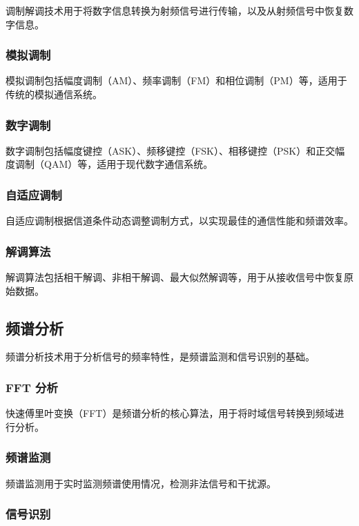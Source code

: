\documentclass[UTF8]{ctexbook}
\begin{document}
调制解调技术用于将数字信息转换为射频信号进行传输，以及从射频信号中恢复数字信息。

\subsubsection{模拟调制}

模拟调制包括幅度调制（AM）、频率调制（FM）和相位调制（PM）等，适用于传统的模拟通信系统。

\subsubsection{数字调制}

数字调制包括幅度键控（ASK）、频移键控（FSK）、相移键控（PSK）和正交幅度调制（QAM）等，适用于现代数字通信系统。

\subsubsection{自适应调制}

自适应调制根据信道条件动态调整调制方式，以实现最佳的通信性能和频谱效率。

\subsubsection{解调算法}

解调算法包括相干解调、非相干解调、最大似然解调等，用于从接收信号中恢复原始数据。

\subsection{频谱分析}

频谱分析技术用于分析信号的频率特性，是频谱监测和信号识别的基础。

\subsubsection{FFT 分析}

快速傅里叶变换（FFT）是频谱分析的核心算法，用于将时域信号转换到频域进行分析。

\subsubsection{频谱监测}

频谱监测用于实时监测频谱使用情况，检测非法信号和干扰源。

\subsubsection{信号识别}
\end{document}
